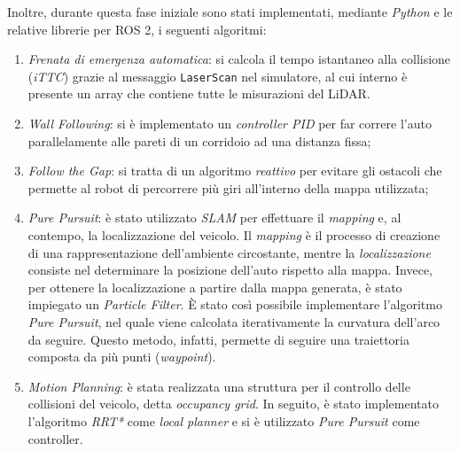 Inoltre, durante questa fase iniziale sono stati implementati, mediante
\textit{Python} e le relative librerie per ROS 2, i seguenti algoritmi:
\begin{enumerate}
    \item \textit{Frenata di emergenza automatica}: si calcola il tempo istantaneo alla
    collisione (\textit{iTTC}) grazie al messaggio \verb|LaserScan| nel simulatore, al cui 
    interno è presente un array che contiene tutte le misurazioni del LiDAR.
    \item \textit{Wall Following}: si è implementato un \textit{controller PID} per 
    far correre l'auto parallelamente alle pareti di un corridoio ad una distanza fissa;
    \item \textit{Follow the Gap}: si tratta di un algoritmo \textit{reattivo}
    per evitare gli ostacoli che permette al robot di percorrere più giri all'interno della mappa utilizzata;
    \item \textit{Pure Pursuit}: è stato utilizzato \textit{SLAM} per effettuare il \textit{mapping}
    e, al contempo, la localizzazione del veicolo. Il \textit{mapping} è il processo di 
    creazione di una rappresentazione dell'ambiente circostante, mentre la \textit{localizzazione} 
    consiste nel determinare la posizione dell'auto rispetto alla mappa. Invece, per ottenere la 
    localizzazione a partire dalla mappa generata, è stato impiegato un \textit{Particle Filter}. 
    È stato così possibile implementare l'algoritmo \textit{Pure Pursuit}, nel quale viene calcolata 
    iterativamente la curvatura dell'arco da seguire. Questo metodo, infatti, permette di seguire una 
    traiettoria composta da più punti (\textit{waypoint}).
    \item \textit{Motion Planning}: è stata realizzata una struttura per il controllo delle 
    collisioni del veicolo, detta \textit{occupancy grid}. In seguito, è stato implementato 
    l'algoritmo \textit{RRT*} come \textit{local planner} e si è utilizzato \textit{Pure Pursuit}
    come controller.
\end{enumerate}
